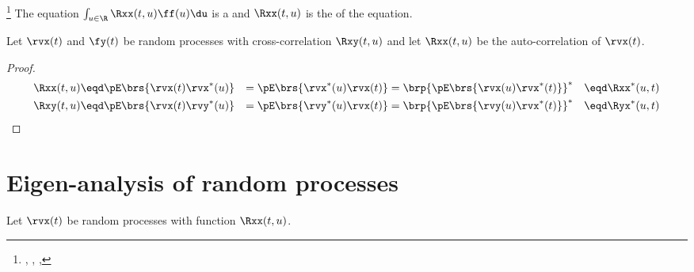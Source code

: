\begin{remark}
\footnote{
  ,
  ,
  ,
  }
The equation $\int_{u\in\R}\Rxx(t,u)\ff(u) \du$ is a
    and
   $\Rxx(t,u)$ is the  of the equation.
\end{remark}


\begin{theorem}
\label{thm:Rxx_prop}
Let $\rvx(t)$ and $\fy(t)$ be random processes with
cross-correlation $\Rxy(t,u)$ and
let $\Rxx(t,u)$ be the auto-correlation of $\rvx(t)$.
\end{theorem}
\begin{proof}
\begin{align*}
   \Rxx(t,u)
      &\eqd \pE\brs{\rvx(t) \rvx^\ast(u)}
      &=    \pE\brs{\rvx^\ast(u) \rvx(t)}
      &=    \brp{ \pE\brs{\rvx(u) \rvx^\ast(t)}}^\ast
      &\eqd \Rxx^\ast(u,t)
\\
   \Rxy(t,u)
      &\eqd \pE\brs{\rvx(t) \rvy^\ast(u)}
      &=    \pE\brs{\rvy^\ast(u) \rvx(t) }
      &=    \brp{\pE\brs{\rvy(u) \rvx^\ast(t)}}^\ast
      &\eqd \Ryx^\ast(u,t)
\end{align*}
\end{proof}

\section{Eigen-analysis of random processes}
\label{sec:KL}
\begin{definition}
\label{def:opR}
Let $\rvx(t)$ be random processes with  function  $\Rxx(t,u)$.
\end{definition}

